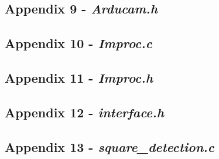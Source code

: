 

\newpage

\subsection{Appendix 9 - \textit{Arducam.h}}\label{A9}




\newpage
\subsection{Appendix 10 - \textit{Improc.c}}\label{A10}



\newpage

\subsection{Appendix 11 - \textit{Improc.h}}\label{A11}



\newpage

\subsection{Appendix 12 - \textit{interface.h}}\label{A12}



\newpage

\subsection{Appendix 13 - \textit{square\_detection.c}}\label{A13}



 

